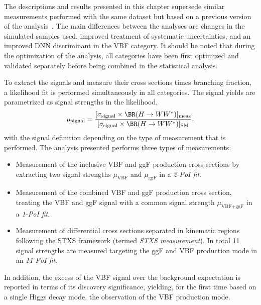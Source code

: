 The descriptions and results presented in this chapter supersede similar measurements performed with the same dataset but based on a previous version of the analysis~\cite{ATLAS-CONF-2021-014}.
The main differences between the analyses are changes in the simulated samples used, improved treatment of systematic uncertainties, and an improved DNN discriminant in the VBF category. 
It should be noted that during the optimization of the analysis, all categories have been first optimized and validated separately before being combined in the statistical analysis.


To extract the signals and measure their cross sections times \HWW branching fraction, a likelihood fit is performed simultaneously in all categories. 
The signal yields are parametrized as signal strengths in the likelihood, 
\begin{equation}
    \label{eq:incl-ggF-VBF-signal-strengths}
    \mu_{\text{signal}} = \frac{ [ \sigma_{\text{signal}}  \times \BR(H \to WW^*) ]_\text{meas} } { [ \sigma_{\text{signal}} \times \BR(H \to WW^*) ]_\text{SM}}, 
\end{equation}
with the signal definition depending on the type of measurement that is performed.
The analysis presented performs three types of measurements:
\begin{itemize}
    \item Measurement of the inclusive VBF and ggF production cross sections by extracting two signal strengths $\mu_{\text{VBF}}$ and $\mu_{\text{ggF}}$ in a \emph{2-PoI fit}.
    \item Measurement of the combined VBF and ggF production cross section, treating the VBF and ggF signal with a common signal strength $\mu_{\text{VBF+ggF}}$ in a \emph{1-PoI fit}.
    \item Measurement of differential cross sections separated in kinematic regions following the STXS framework (termed \emph{STXS measurement}). In total 11 signal strengths are measured targeting the ggF and VBF production mode in an \emph{11-PoI fit}. 
\end{itemize}
In addition, the excess of the VBF signal over the background expectation is reported in terms of its discovery significance, yielding, for the first time based on a single Higgs decay mode, the observation of the VBF production mode.

